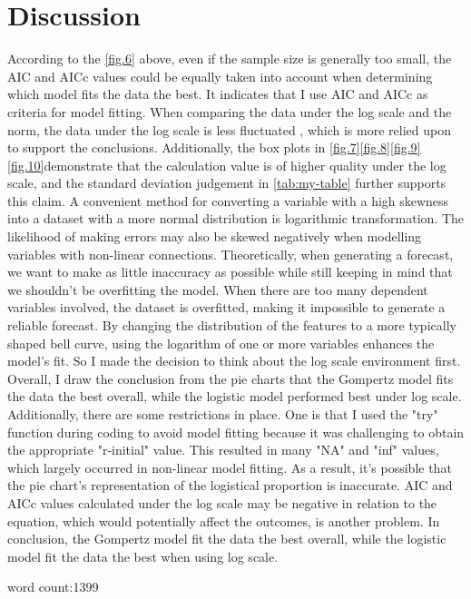 \documentclass[11pt]{article}
\begin{document}
\section{Discussion}
According to the \ref{fig.6} above, even if the sample size is generally too small, the AIC and AICc values could be equally taken into account when determining which model fits the data the best. It indicates that I use AIC and AICc as criteria for model fitting. When comparing the data under the log scale and the norm, the data under the log scale is less fluctuated , which is more relied upon to support the conclusions\citep{burnham2004multimodel}. Additionally, the box plots in \ref{fig.7}\ref{fig.8}\ref{fig.9}\ref{fig.10}demonstrate that the calculation value is of higher quality under the log scale, and the standard deviation judgement in \ref{tab:my-table} further supports this claim. A convenient method for converting a variable with a high skewness into a dataset with a more normal distribution is logarithmic transformation. The likelihood of making errors may also be skewed negatively when modelling variables with non-linear connections. Theoretically, when generating a forecast, we want to make as little inaccuracy as possible while still keeping in mind that we shouldn't be overfitting the model\citep{claeskens2008model}. When there are too many dependent variables involved, the dataset is overfitted, making it impossible to generate a reliable forecast. By changing the distribution of the features to a more typically shaped bell curve, using the logarithm of one or more variables enhances the model's fit. So I made the decision to think about the log scale environment first. Overall, I draw the conclusion from the pie charts that the Gompertz model fits the data the best overall, while the logistic model performed best under log scale\citep{verwijst1991logarithmic}.
Additionally, there are some restrictions in place. One is that I used the "try" function during coding to avoid model fitting because it was challenging to obtain the appropriate "r-initial" value. This resulted in many "NA" and "inf" values, which largely occurred in non-linear model fitting. As a result, it's possible that the pie chart's representation of the logistical proportion is inaccurate. AIC and AICc values calculated under the log scale may be negative in relation to the equation, which would potentially affect the outcomes, is another problem.
In conclusion, the Gompertz model fit the data the best overall, while the logistic model fit the data the best when using log scale.

word count:1399



\end{document}

